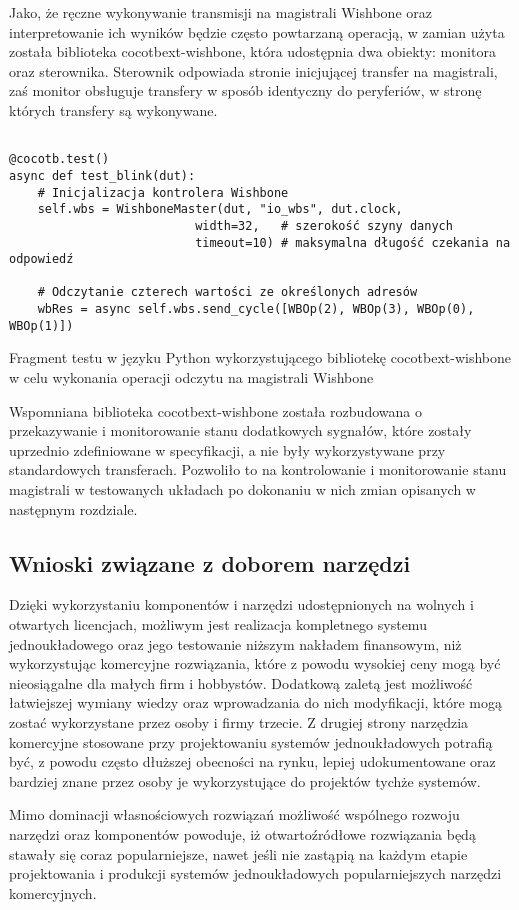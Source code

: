 Jako, że ręczne wykonywanie transmisji na magistrali Wishbone oraz interpretowanie ich wyników będzie często powtarzaną operacją, w zamian użyta została biblioteka cocotbext-wishbone, która udostępnia dwa obiekty: monitora oraz sterownika. Sterownik odpowiada stronie inicjującej transfer na magistrali, zaś monitor obsługuje transfery w sposób identyczny do peryferiów, w stronę których transfery są wykonywane.

\begin{listing}[H]
\begin{verbatim}

@cocotb.test()
async def test_blink(dut):
    # Inicjalizacja kontrolera Wishbone
    self.wbs = WishboneMaster(dut, "io_wbs", dut.clock,
                          width=32,   # szerokość szyny danych
                          timeout=10) # maksymalna długość czekania na odpowiedź

    # Odczytanie czterech wartości ze określonych adresów
    wbRes = async self.wbs.send_cycle([WBOp(2), WBOp(3), WBOp(0), WBOp(1)])
\end{verbatim}
\caption{\label{lst:tooling-cocotbext-wishbone-example}Fragment testu w języku Python wykorzystującego bibliotekę cocotbext-wishbone w celu wykonania operacji odczytu na magistrali Wishbone}
\end{listing}

Wspomniana biblioteka cocotbext-wishbone została rozbudowana o przekazywanie i monitorowanie stanu dodatkowych sygnałów, które zostały uprzednio zdefiniowane w specyfikacji, a nie były wykorzystywane przy standardowych transferach. Pozwoliło to na kontrolowanie i monitorowanie stanu magistrali w testowanych układach po dokonaniu w nich zmian opisanych w następnym rozdziale.

\subsection{Wnioski związane z doborem narzędzi}

Dzięki wykorzystaniu komponentów i narzędzi udostępnionych na wolnych i otwartych licencjach, możliwym jest realizacja kompletnego systemu jednoukładowego oraz jego testowanie niższym nakładem finansowym, niż wykorzystując komercyjne rozwiązania, które z powodu wysokiej ceny mogą być nieosiągalne dla małych firm i hobbystów.
Dodatkową zaletą jest możliwość łatwiejszej wymiany wiedzy oraz wprowadzania do nich modyfikacji, które mogą zostać wykorzystane przez osoby i firmy trzecie.
Z drugiej strony narzędzia komercyjne stosowane przy projektowaniu systemów jednoukładowych potrafią być, z powodu często dłuższej obecności na rynku, lepiej udokumentowane oraz bardziej znane przez osoby je wykorzystujące do projektów tychże systemów.

Mimo dominacji własnościowych rozwiązań możliwość wspólnego rozwoju narzędzi oraz komponentów powoduje, iż otwartoźródłowe rozwiązania będą stawały się coraz popularniejsze, nawet jeśli nie zastąpią na każdym etapie projektowania i produkcji systemów jednoukładowych popularniejszych narzędzi komercyjnych.
